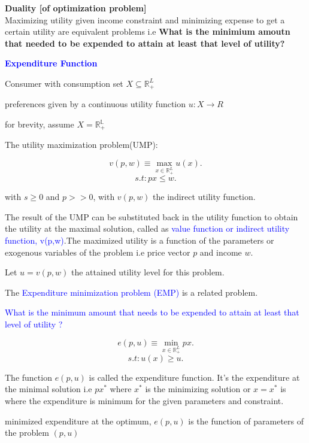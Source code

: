 \documentclass{tufte-handout}
\begin{document}
\clearpage

\textbf{\large{Duality [of optimization problem] }}\\
Maximizing utility given income constraint and minimizing expense to get a certain utility are equivalent problems i.e \textbf{ What is the minimium amoutn that needed to be expended to attain at least that level of utility?}

\vspace{0.5cm}

\textcolor{blue}{\textbf{Expenditure Function}}


\textbullet  Consumer with consumption set $ X  \subseteq   \mathbb{R}^L_+$

\textbullet  preferences given by a continuous utility function 
$u: X \to R$

\textbullet  for brevity, assume $X = \mathbb{R_+ ^L}$

\textbullet   The utility maximization problem(UMP):

\[v(p,w) \equiv \max_{x \in \mathbb{R}_+^L} u(x) .\]
\[ s.t : px \leq w .\]

with $s \geq 0$ and  $p >> 0$, with  $v(p,w)$ the indirect utility function.

\textbullet  The result of the UMP can be substituted back in the utility function to obtain the utility at the maximal solution, called as \textcolor{blue}{value function or indirect utility function, v(p,w)}.The maximized utility is a function of the parameters or exogenous variables of the problem i.e price vector $p$ and income $w$. 


\textbullet  Let $ u =v(p,w)$ the attained utility level for this problem.


\textbullet  The \textcolor{blue}{Expenditure minimization problem (EMP)} is a related problem.


\textbullet   \textcolor{blue}{ What is the minimum amount that needs to be expended to attain at least that level of utility ?}

\[ e(p,u) \equiv \min_{x \in \mathbb{R}_+ ^L} px  .\]  
\[s.t : u(x) \geq u .\]

\textbullet   The function $e(p,u)$ is called the expenditure function. It's the expenditure at the minimal solution i.e  $px^*$ where  $x^*$ is the minimizing solution or  $x=x^*$ is where the expenditure is minimum for the given parameters and constraint.

 \textbullet  minimized expenditure at the optimum, $e(p,u)$ is the function of parameters of the problem  $(p,u)$
\end{document}

